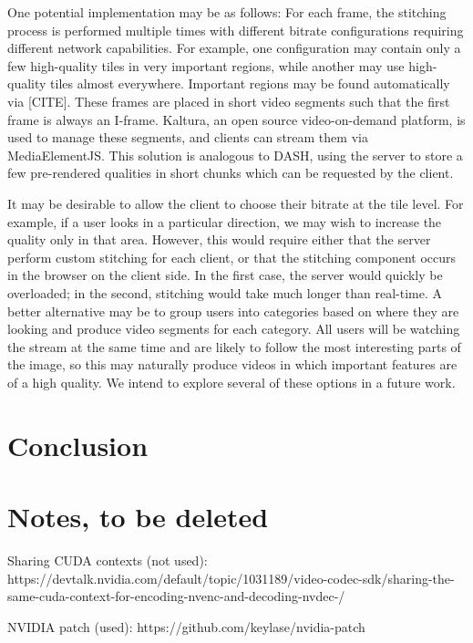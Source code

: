 One potential implementation may be as follows: For each frame, the stitching process is performed multiple times with different bitrate configurations requiring different network capabilities. For example, one configuration may contain only a few high-quality tiles in very important regions, while another may use high-quality tiles almost everywhere. Important regions may be found automatically via [CITE]. These frames are placed in short video segments such that the first frame is always an I-frame. Kaltura, an open source video-on-demand platform, is used to manage these segments, and clients can stream them via MediaElementJS. This solution is analogous to DASH, using the server to store a few pre-rendered qualities in short chunks which can be requested by the client.

It may be desirable to allow the client to choose their bitrate at the tile level. For example, if a user looks in a particular direction, we may wish to increase the quality only in that area. However, this would require either that the server perform custom stitching for each client, or that the stitching component occurs in the browser on the client side. In the first case, the server would quickly be overloaded; in the second, stitching would take much longer than real-time. A better alternative may be to group users into categories based on where they are looking and produce video segments for each category. All users will be watching the stream at the same time and are likely to follow the most interesting parts of the image, so this may naturally produce videos in which important features are of a high quality. We intend to explore several of these options in a future work.

\section{Conclusion}

\section{Notes, to be deleted}
Sharing CUDA contexts (not used): https://devtalk.nvidia.com/default/topic/1031189/video-codec-sdk/sharing-the-same-cuda-context-for-encoding-nvenc-and-decoding-nvdec-/

NVIDIA patch (used): https://github.com/keylase/nvidia-patch
